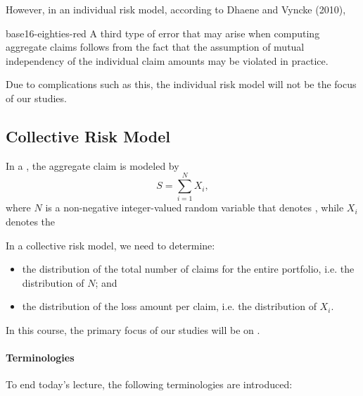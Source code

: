 \documentclass[notoc,notitlepage]{tufte-book}
\begin{document}
However, in an individual risk model, according to Dhaene and Vyncke (2010)\cite{DhaeneVyncke2010},

\begin{quotebox}{base16-eighties-red}
  A third type of error that may arise when computing aggregate claims follows from the fact that the assumption of mutual independency of the individual claim amounts may be violated in practice.
\end{quotebox}

Due to complications such as this, the individual risk model will not be the focus of our studies.


\subsection{Collective Risk Model}%
\label{sub:collective_risk_model}

\begin{defn}
\label{defn:collective_risk_model}
  In a , the aggregate claim is modeled by
  \begin{equation*}
    S = \sum_{i=1}^{N} X_i, \end{equation*}
  where $N$ is a non-negative integer-valued random variable that denotes , while $X_i$ denotes the 
\end{defn}

\begin{note}
  In a collective risk model, we need to determine:
  \begin{itemize}
    \item the distribution of the total number of claims for the entire portfolio, i.e. the distribution of $N$; and
    \item the distribution of the loss amount per claim, i.e. the distribution of $X_i$.
  \end{itemize}
\end{note}


In this course, the primary focus of our studies will be on .

\paragraph{Terminologies} To end today's lecture, the following terminologies are introduced:
\end{document}
